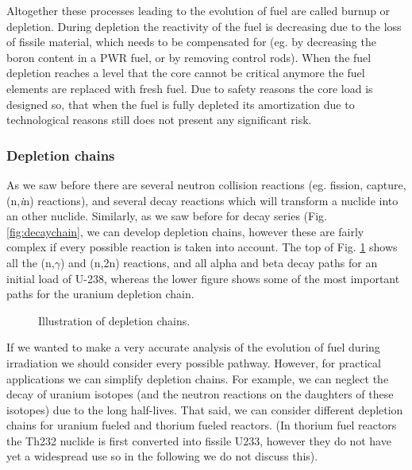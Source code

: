 Altogether these processes leading to the evolution of fuel are called burnup or depletion. During depletion the reactivity of the fuel is decreasing due to the loss of fissile material, which needs to be compensated for (eg. by decreasing the boron content in a PWR fuel, or by removing control rods). When the fuel depletion reaches a level that the core cannot be critical anymore the fuel elements are replaced with fresh fuel. Due to safety reasons the core load is designed so, that when the fuel is fully depleted its amortization due to technological reasons still does not present any significant risk.

\subsubsection{Depletion chains}

As we saw before there are several neutron collision reactions (eg. fission, capture, (n,\textit{i}n) reactions), and several decay reactions which will transform a nuclide into an other nuclide. Similarly, as we saw before for decay series (Fig. \ref{fig:decaychain}, we can develop depletion chains, however these are fairly complex if every possible reaction is taken into account. The top of Fig. \ref{fig:depletionchain} shows all the (n,$\gamma$) and (n,2n) reactions, and all alpha and beta decay paths for an initial load of U-238, whereas the lower figure shows some of the most important paths for the uranium depletion chain.

\begin{figure}[ht!]
\protect {}\protect
\caption{\label{fig:depletionchain} \footnotesize{Illustration of depletion chains.}}
\end{figure}

If we wanted to  make a very accurate analysis of the evolution of fuel during irradiation we should consider every possible pathway. However, for practical applications we can simplify depletion chains. For example, we can neglect the decay of uranium isotopes (and the neutron reactions on the daughters of these isotopes) due to the long half-lives. That said, we can consider different depletion chains for uranium fueled and thorium fueled reactors. (In thorium fuel reactors the Th232 nuclide is first converted into fissile U233, however they do not have yet a widespread use so in the following we do not discuss this).

